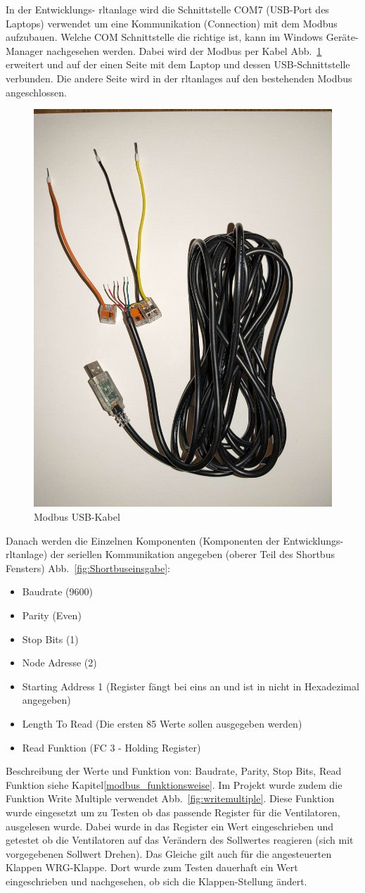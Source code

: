 In der Entwicklungs- \ac{rltanlage} wird die Schnittstelle COM7 (USB-Port des Laptops) verwendet um eine Kommunikation (Connection) mit dem Modbus aufzubauen. Welche COM Schnittstelle die richtige ist, kann im Windows Geräte-Manager nachgesehen werden. Dabei wird der Modbus per Kabel  Abb.~\ref{fig:modbus_usbkabel} erweitert und auf der einen Seite mit dem Laptop und dessen USB-Schnittstelle verbunden. Die andere Seite wird in der \acp{rltanlage} auf den bestehenden Modbus angeschlossen. 

\begin{figure}[H]
	\centering
	\includegraphics[width=0.3\linewidth]{Bilder/modbus_usbkabel}
	\caption{Modbus USB-Kabel} 
	\label{fig:modbus_usbkabel}
\end{figure}

Danach werden die Einzelnen Komponenten (Komponenten der Entwicklungs- \ac{rltanlage}) der seriellen Kommunikation angegeben (oberer Teil des Shortbus Fensters) Abb.~\ref{fig:Shortbuseinsgabe}:
\begin{itemize}
	\item Baudrate (9600)
	\item Parity (Even)
	\item Stop Bits (1)
	\item Node Adresse (2)
	\item Starting Address 1 (Register fängt bei eins an und ist in nicht in Hexadezimal angegeben)
	\item Length To Read (Die ersten 85 Werte sollen ausgegeben werden)
	\item Read Funktion (FC 3 - Holding Register)
\end{itemize}

Beschreibung der Werte und Funktion von: Baudrate, Parity, Stop Bits, Read Funktion siehe Kapitel\ref{modbus_funktionsweise}.
Im Projekt wurde zudem die Funktion Write Multiple verwendet Abb.~\ref{fig:writemultiple}. Diese Funktion wurde eingesetzt um zu Testen ob das passende Register für \zB die Ventilatoren, ausgelesen wurde. Dabei wurde in das Register ein Wert eingeschrieben und getestet ob die Ventilatoren auf das Verändern des Sollwertes reagieren (sich mit vorgegebenen Sollwert Drehen). Das Gleiche gilt auch für die angesteuerten Klappen \zB WRG-Klappe. Dort wurde zum Testen dauerhaft ein Wert eingeschrieben und nachgesehen, ob sich die Klappen-Stellung ändert.

